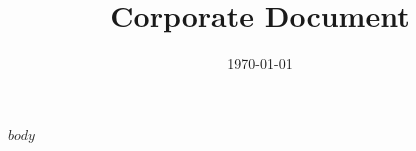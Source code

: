 \documentclass{article}
\begin{document}
    \title{Corporate Document}
    \date{\today}
    \maketitle
    $body$
\end{document}
